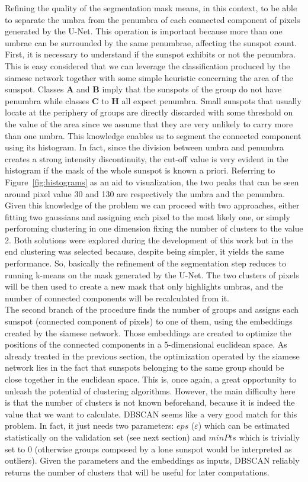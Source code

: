 Refining the quality of the segmentation mask means, in this context, to be able to separate the umbra from the penumbra of each connected component of pixels generated by the U-Net. This operation is important because more than one umbrae can be surrounded by the same penumbrae, affecting the sunspot count. First, it is necessary to understand if the sunspot exhibits or not the penumbra. This is easy considered that we can leverage the classification produced by the siamese network together with some simple heuristic concerning the area of the sunspot. Classes \textbf{A} and \textbf{B} imply that the sunspots of the group do not have penumbra while classes \textbf{C} to \textbf{H} all expect penumbra. Small sunspots that usually locate at the periphery of groups are directly discarded with some threshold on the value of the area since we assume that they are very unlikely to carry more than one umbra. This knowledge enables us to segment the connected component using its histogram. In fact, since the division between umbra and penumbra creates a strong intensity discontinuity, the cut-off value is very evident in the histogram if the mask of the whole sunspot is known a priori. Referring to Figure~\ref{fig:histograms} as an aid to visualization, the two peaks that can be seen around pixel value 30 and 130 are respectively the umbra and the penumbra. Given this knowledge of the problem we can proceed with two approaches, either fitting two gaussians and assigning each pixel to the most likely one, or simply perforoming clustering in one dimension fixing the number of clusters to the value 2. Both solutions were explored during the development of this work but in the end clustering was selected because, despite being simpler, it yields the same performance. So, basically the refinement of the segmentation step reduces to running k-means on the mask generated by the U-Net. The two clusters of pixels will be then used to create a new mask that only highlights umbras, and the number of connected components will be recalculated from it.\\
The second branch of the procedure finds the number of groups and assigns each sunspot (connected component of pixels) to one of them, using the embeddings created by the siamese network. Those embeddings are created to optimize the positions of the connected components in a 5-dimensional euclidean space. As already treated in the previous section, the optimization operated by the siamese network lies in the fact that sunspots belonging to the same group should be close together in the euclidean space. This is, once again, a great opportunity to unleash the potential of clustering algorithms. However, the main difficulty here is that the number of clusters is not known beforehand, because it is indeed the value that we want to calculate. DBSCAN seems like a very good match for this problem. In fact, it just needs two parameters: $eps$ ($\varepsilon$) which can be estimated statistically on the validation set (see next section) and $minPts$ which is trivially set to 0 (otherwise groups composed by a lone sunspot would be interpreted as outliers). Given the parameters and the embeddings as inputs, DBSCAN reliably returns the number of clusters that will be useful for later computations.\\
